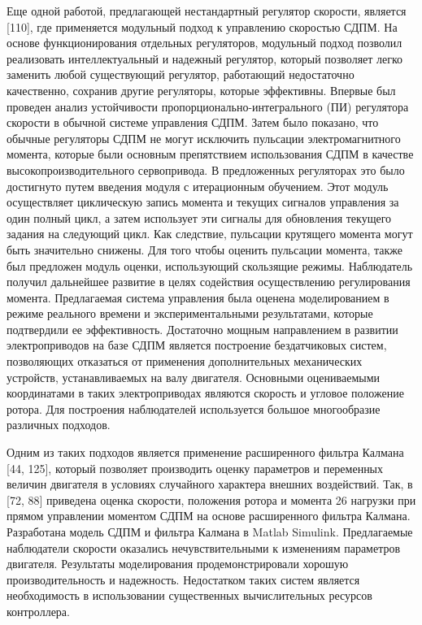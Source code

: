 Еще одной работой, предлагающей нестандартный регулятор скорости, является [110], где применяется модульный подход к управлению скоростью СДПМ. На основе функционирования отдельных регуляторов, модульный подход позволил реализовать интеллектуальный и надежный регулятор, который позволяет легко заменить любой существующий регулятор, работающий недостаточно качественно, сохранив другие регуляторы, которые эффективны. Впервые был проведен анализ устойчивости пропорционально-интегрального (ПИ) регулятора скорости в обычной системе управления СДПМ. Затем было показано, что обычные регуляторы СДПМ не могут исключить пульсации электромагнитного момента, которые были основным препятствием использования СДПМ в качестве высокопроизводительного сервопривода. В предложенных регуляторах это было достигнуто путем введения модуля с итерационным обучением. Этот модуль осуществляет циклическую запись момента и текущих сигналов управления за один полный цикл, а затем использует эти сигналы для обновления текущего задания на следующий цикл. Как следствие, пульсации крутящего момента могут быть значительно снижены. Для того чтобы оценить пульсации момента, также был предложен модуль оценки, использующий скользящие режимы. Наблюдатель получил дальнейшее развитие в целях содействия осуществлению регулирования момента. Предлагаемая система управления была оценена моделированием в режиме реального времени и экспериментальными результатами, которые подтвердили ее эффективность.
Достаточно мощным направлением в развитии электроприводов на базе СДПМ является построение бездатчиковых систем, позволяющих отказаться от применения дополнительных механических устройств, устанавливаемых на валу двигателя. Основными оцениваемыми координатами в таких электроприводах являются скорость и угловое положение ротора. Для построения наблюдателей используется большое многообразие различных подходов. 

Одним из таких подходов является применение расширенного фильтра Калмана [44, 125], который позволяет производить оценку параметров и переменных величин двигателя в условиях случайного характера внешних воздействий. Так, в [72, 88] приведена оценка скорости, положения ротора и момента 26 нагрузки при прямом управлении моментом СДПМ на основе расширенного фильтра Калмана. Разработана модель СДПМ и фильтра Калмана в Matlab Simulink. Предлагаемые наблюдатели скорости оказались нечувствительными к изменениям параметров двигателя. Результаты моделирования продемонстрировали хорошую производительность и надежность. Недостатком таких систем является необходимость в использовании существенных вычислительных ресурсов контроллера. 

